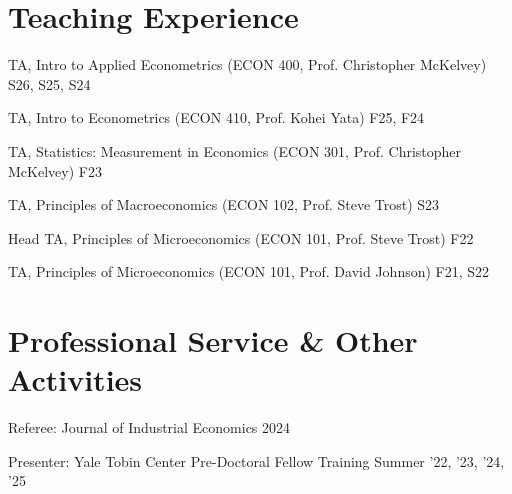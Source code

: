 \documentclass[letterpaper]{article}
\renewenvironment{itemize}{
	\begin{list}{}{
			\setlength{\leftmargin}{1.5em}
		}
	}{
	\end{list}
}
\begin{document}
%	
%	
	
%	
	
	
	\section*{Teaching Experience}
	\begin{itemize}
		\item TA, Intro to Applied Econometrics (ECON 400, Prof. Christopher McKelvey) \hfill S26, S25, S24
		\item TA, Intro to Econometrics (ECON 410, Prof. Kohei Yata) \hfill F25, F24
		\item TA, Statistics: Measurement in Economics (ECON 301, Prof. Christopher McKelvey) \hfill F23
		\item TA, Principles of Macroeconomics (ECON 102, Prof. Steve Trost) \hfill S23
		\item Head TA, Principles of Microeconomics (ECON 101, Prof. Steve Trost) \hfill F22
		\item TA, Principles of Microeconomics (ECON 101, Prof. David Johnson) \hfill F21, S22
	\end{itemize}
	
	\section*{Professional Service \& Other Activities}
	\begin{itemize}
		\item Referee: Journal of Industrial Economics \hfill 2024
		\item Presenter: Yale Tobin Center Pre-Doctoral Fellow Training \hfill Summer '22, '23, '24, '25

	\end{itemize}
	
\end{document}

